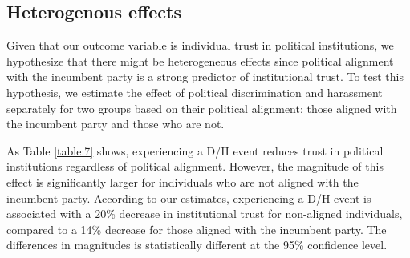 \documentclass{article}
\begin{document}



% 

\subsection{Heterogenous effects}

Given that our outcome variable is individual trust in political institutions, we hypothesize that there might be heterogeneous effects since political alignment with the incumbent party is a strong predictor of institutional trust. To test this hypothesis, we estimate the effect of political discrimination and harassment separately for two groups based on their political alignment: those aligned with the incumbent party and those who are not.

As Table \ref{table:7} shows, experiencing a D/H event reduces trust in political institutions regardless of political alignment. However, the magnitude of this effect is significantly larger for individuals who are not aligned with the incumbent party. According to our estimates, experiencing a D/H event is associated with a 20\% decrease in institutional trust for non-aligned individuals, compared to a 14\% decrease for those aligned with the incumbent party. The differences in magnitudes is statistically different at the 95\% confidence level.
\end{document}
